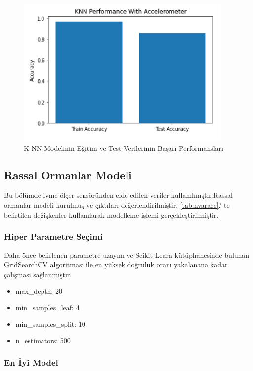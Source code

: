 \documentclass[12pt,twoside]{deuthesis}
\providecommand{\tightlist}{%
  \setlength{\itemsep}{0pt}\setlength{\parskip}{0pt}}
\begin{document}
\begin{figure}

{\centering \includegraphics[width=0.6\linewidth,height=0.25\textheight]{figure/iknn_testtrain} 

}

\caption{K-NN Modelinin Eğitim ve Test Verilerinin Başarı Performansları}\label{fig:iknntesttrain}
\end{figure}
\hypertarget{rassal-ormanlar-modeli-1}{%
\subsection{Rassal Ormanlar Modeli}\label{rassal-ormanlar-modeli-1}}

Bu bölümde ivme ölçer sensöründen elde edilen veriler kullanılmıştır.Rassal ormanlar modeli kurulmuş ve çıktıları değerlendirilmiştir.
\ref{tab:nvaracc}.' te belirtilen değişkenler kullanılarak modelleme işlemi gerçekleştirilmiştir.

\hypertarget{hiper-parametre-seuxe7imi-5}{%
\subsubsection{Hiper Parametre Seçimi}\label{hiper-parametre-seuxe7imi-5}}

Daha önce belirlenen parametre uzayını ve Scikit-Learn kütüphanesinde bulunan GridSearchCV algoritması ile en yüksek doğruluk oranı yakalanana kadar çalışması sağlanmıştır.
\begin{itemize}
\tightlist
\item
  max\_depth: 20
\item
  min\_samples\_leaf: 4
\item
  min\_samples\_split: 10
\item
  n\_estimators: 500
\end{itemize}
\hypertarget{en-iyi-model-6}{%
\subsubsection{En İyi Model}\label{en-iyi-model-6}}
\end{document}
